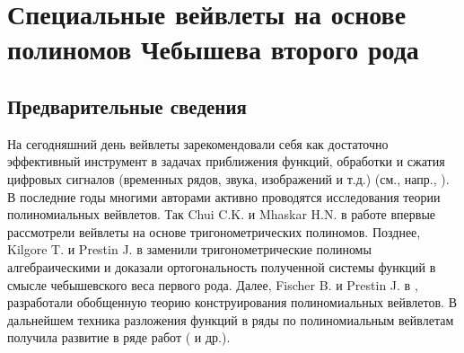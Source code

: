 \chapter{Специальные вейвлеты на основе полиномов Чебышева второго рода}


\section{Предварительные сведения}
На сегодняшний день вейвлеты зарекомендовали себя как достаточно эффективный инструмент
в задачах приближения функций, обработки и сжатия цифровых сигналов (временных рядов, звука, изображений и т.д.) (см., напр.,
\cite{sms1}\cite{sms2}\cite{sms3}).
В последние годы многими
авторами активно проводятся исследования теории полиномиальных вейвлетов.
Так Chui C.K. и Mhaskar H.N. в работе \cite{sms4}
впервые рассмотрели вейвлеты на основе тригонометрических полиномов.
Позднее, Kilgore T. и Prestin J. в \cite{sms5}
заменили тригонометрические полиномы алгебраическими и доказали ортогональность полученной системы функций в смысле чебышевского веса первого рода.
Далее, Fischer B. и Prestin J. в \cite{sms6},
разработали обобщенную теорию конструирования полиномиальных вейвлетов.
В дальнейшем техника разложения функций в ряды по полиномиальным вейвлетам получила развитие в ряде работ
(\cite{sms7}\cite{sms8}\cite{sms9} и др.).

